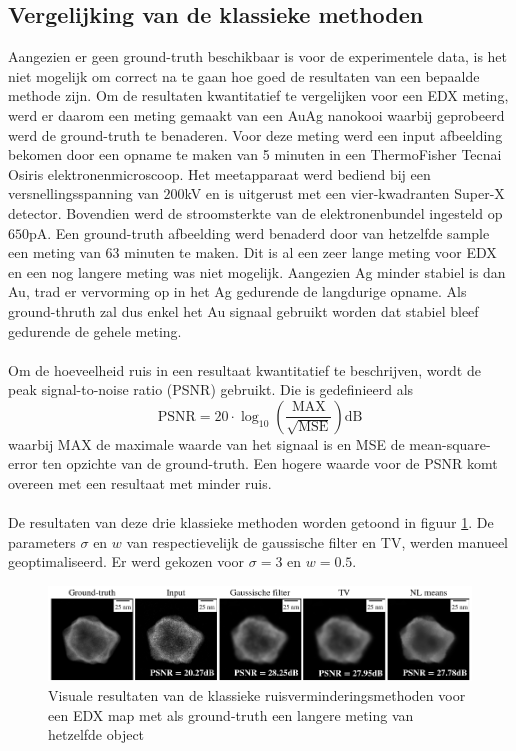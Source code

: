 \documentclass{report}
\begin{document}
\subsection{Vergelijking van de klassieke methoden}
Aangezien er geen ground-truth beschikbaar is voor de experimentele data, is het niet mogelijk om correct na te gaan hoe goed de resultaten van een bepaalde methode zijn. Om de resultaten kwantitatief te vergelijken voor een EDX meting, werd er daarom een meting gemaakt van een AuAg nanokooi waarbij geprobeerd werd de ground-truth te benaderen. Voor deze meting werd een input afbeelding bekomen door een opname te maken van 5 minuten in een ThermoFisher Tecnai Osiris elektronenmicroscoop. Het meetapparaat werd bediend bij een versnellingsspanning van $200$kV en is uitgerust met een vier-kwadranten Super-X detector. Bovendien werd de stroomsterkte van de elektronenbundel ingesteld op $650$pA. Een ground-truth afbeelding werd benaderd door van hetzelfde sample een meting van 63 minuten te maken. Dit is al een zeer lange meting voor EDX en een nog langere meting was niet mogelijk. Aangezien Ag minder stabiel is dan Au, trad er vervorming op in het Ag gedurende de langdurige opname. Als ground-thruth zal dus enkel het Au signaal gebruikt worden dat stabiel bleef gedurende de gehele meting.
\\ \\
Om de hoeveelheid ruis in een resultaat kwantitatief te beschrijven, wordt de peak signal-to-noise ratio (PSNR) gebruikt. Die is gedefinieerd als
\[ \text{PSNR} = 20 \cdot \log_{10} \left( \frac{\text{MAX}}{\sqrt{\text{MSE}}} \right) \text{dB} \]
waarbij MAX de maximale waarde van het signaal is en MSE de mean-square-error ten opzichte van de ground-truth. Een hogere waarde voor de PSNR komt overeen met een resultaat met minder ruis.
\\ \\
De resultaten van deze drie klassieke methoden worden getoond in figuur \ref{fig:nets_class_vis_edx}. De parameters $\sigma$ en $w$ van respectievelijk de gaussische filter en TV, werden manueel geoptimaliseerd. Er werd gekozen voor $\sigma=3$ en $w=0.5$.
\begin{figure}[h!]
	\centering
	\includegraphics[width=15cm]{images/nets/class_vis_edx.png}
	\caption{Visuale resultaten van de klassieke ruisverminderingsmethoden voor een EDX map met als ground-truth een langere meting van hetzelfde object}
	\label{fig:nets_class_vis_edx}
\end{figure}
\end{document}
